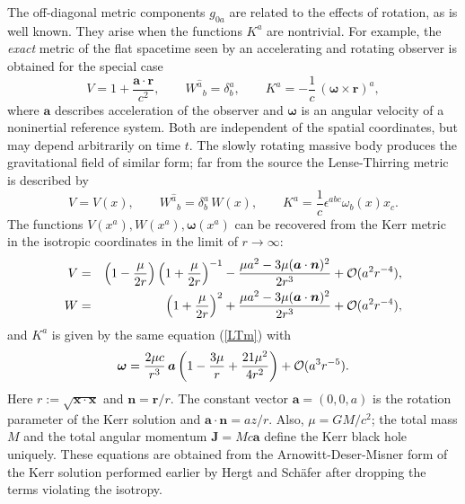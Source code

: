 \documentclass[preprint,showpacs,preprintnumbers,eqsecnum,amsmath,amssymb]{revtex4}
\begin{document}
The off-diagonal metric components $g_{0a}$ are related to the
effects of rotation, as is well known. They arise when the
functions $K^a$ are nontrivial. For example, the {\it exact}
metric of the flat spacetime seen by an accelerating and rotating
observer is obtained for the special case \cite{HN}
\begin{equation}
V = 1 + {\frac {{\bm a}\cdot{\bm r}}{c^2}},\qquad W^{\widehat
a}{}_b = \delta^a_b,\qquad K^a =-{\frac 1c}\,(\bm\omega\times\bm
r)^a,\label{VWni}
\end{equation}
where ${\bm a}$ describes acceleration of the observer and
$\bm\omega$ is an angular velocity of a noninertial reference
system. Both are independent of the spatial coordinates, but may
depend arbitrarily on time $t$. The slowly rotating massive body
produces the gravitational field of similar form; far from the
source the Lense-Thirring \cite{LT} metric is described by
\begin{equation}
V = V(x),\qquad W^{\widehat a}{}_b = \delta^a_b\,W(x), \qquad K^a
={\frac 1c}\epsilon^{abc}\omega_b(x)x_c.\label{LTm}
\end{equation}
The functions $V(x^a), W(x^a), \bm{\omega}(x^a)$ can be recovered
from the Kerr metric in the isotropic coordinates in the limit of
$r\rightarrow\infty$:
\begin{eqnarray}\label{Vkerr}
V &=&\left(1 - {\frac {\mu}{2r}}\right) \left(1 + {\frac {\mu}{2r}}\right)^{-1}
- {\frac {\mu a^2 - 3\mu(\bm{a}\cdot\bm{n})^2}{2r^3}} + {\cal O}(a^2r^{-4}),\\
W &=& \left(1 + {\frac {\mu} {2r}}\right)^{2} + {\frac {\mu a^2 -
3\mu (\bm{a}\cdot\bm{n})^2}{2r^3}} + {\cal O}(a^2r^{-4}),\label{Wkerr}
\end{eqnarray}
and $K^a$ is given by the same equation (\ref{LTm}) with
\begin{equation}
\bm{\omega} = {\frac{2\mu c}{r^3}}\,\bm{a}\left(1 - {\frac
{3\mu}{r}} + {\frac {21\mu^2}{4r^2}}\right) + {\cal O}(a^3r^{-5}).\label{Okerr}
\end{equation}
Here $r := \sqrt{\bm{x}\cdot\bm{x}}$ and $\bm{n} = \bm{r}/r$. The
constant vector $\bm{a} = (0, 0, a)$ is the rotation parameter of
the Kerr solution and $\bm{a}\cdot\bm{n}=az/r$. Also, $\mu =
GM/c^2$; the total mass $M$ and the total angular momentum $\bm{J}
= Mc\bm{a}$ define the Kerr black hole uniquely. These equations
are obtained from the Arnowitt-Deser-Misner form \cite{ADM} of the
Kerr solution performed earlier by Hergt and Sch\"afer
\cite{hergt} after dropping the terms violating the isotropy.
\end{document}
